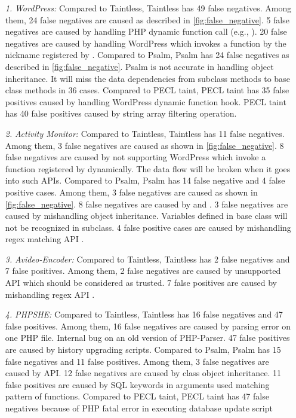 \begin{itemize}[leftmargin=*]
    \item [\it 1.] {\it WordPress:} 
    Compared to Taintless, Taintless has 49 false negatives. Among them, 24 false negatives are caused as described in \autoref{fig:false_negative}. 5 false negatives are caused by handling PHP dynamic function call (e.g., ). 20 false negatives are caused by handling WordPress  which invokes a function by the nickname registered by .
    Compared to Psalm, Psalm has 24 false negatives as described in \autoref{fig:false_negative}. Psalm is not accurate in handling object inheritance. It will miss the data dependencies from subclass methods to base class methods in 36 cases.
    Compared to PECL taint, PECL taint has 35 false positives caused by handling WordPress  dynamic function hook.  PECL taint has 40 false positives caused by string array filtering operation.
    
    \item [\it 2.] {\it Activity Monitor:}
     Compared to Taintless, Taintless has 11 false negatives. Among them, 3 false negatives are caused as shown in \autoref{fig:false_negative}. 8 false negatives are caused by not supporting WordPress  which invoke a function registered by  dynamically. The data flow will be broken when it goes into such APIs.
    Compared to Psalm, Psalm has 14 false negative and 4 false positive cases. Among them, 3 false negatives are caused as shown in \autoref{fig:false_negative}. 8 false negatives are caused by  and . 3 false negatives are caused by mishandling object inheritance. Variables defined in base class will not be recognized in subclass. 4 false positive cases are caused by mishandling regex matching API .
    
    \item[\it 3.] {\it Avideo-Encoder:}
    Compared to Taintless, Taintless has 2 false negatives and 7 false positives. Among them, 2 false negatives are caused by unsupported API  which should be considered as trusted. 7 false positives are caused by mishandling regex API . 
    
    \item[\it 4.] {\it PHPSHE:}
    Compared to Taintless, Taintless has 16 false negatives and 47 false positives. Among them, 16 false negatives are caused by parsing error on one PHP file. Internal bug on an old version of PHP-Parser. 47 false positives are caused by history upgrading scripts.
    Compared to Psalm, Psalm has 15 false negatives and 11 false positives. Among them, 3 false negatives are caused by  API. 12 false negatives are caused by class object inheritance. 11 false positives are caused by SQL keywords in arguments used matching pattern of  functions. 
    Compared to PECL taint, PECL taint has 47 false negatives because of PHP fatal error in executing database update script
    

\end{itemize}
